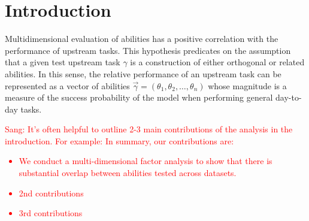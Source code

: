 \section{Introduction}
Multidimensional evaluation of abilities has a positive correlation with the performance of upstream tasks. This hypothesis predicates on the assumption that a given test upstream task $\gamma$ is a construction of either orthogonal or related abilities. In this sense, the relative performance of an upstream task can be represented as a vector of abilities $\vec{\gamma} = (\theta_1, \theta_2, \ldots, \theta_n)$ whose magnitude is a measure of the success probability of the model when performing general day-to-day tasks.

\textcolor{red}{Sang: It's often helpful to outline 2-3 main contributions of the analysis in the introduction. For example: 
In summary, our contributions are:
\begin{itemize}
    \item We conduct a multi-dimensional factor analysis to show that there is substantial overlap between abilities tested across datasets.
    \item 2nd contributions
    \item 3rd contributions
\end{itemize}
}